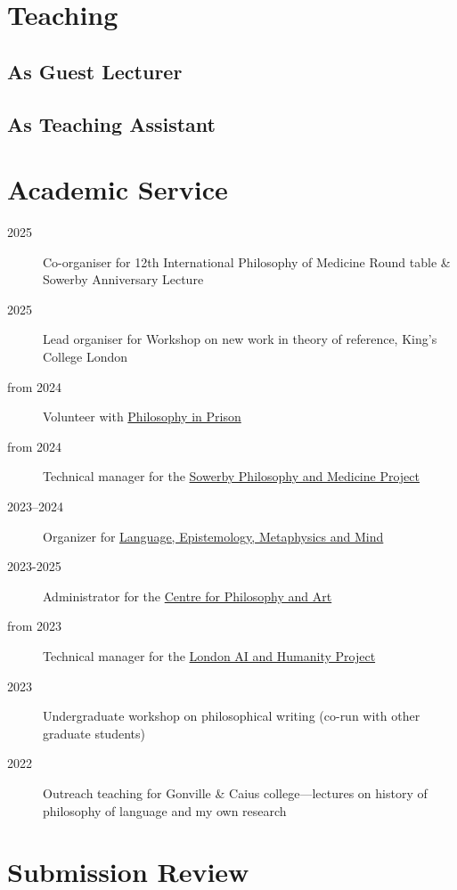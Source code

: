 \documentclass{cv}
\begin{document}
\section*{Teaching}
\subsection*{As Guest Lecturer}
\printbibliography[env=teaching,check=Teaching+GuestLecturer]{}

\subsection*{As Teaching Assistant}
\printbibliography[env=teaching,check=Teaching+TA]{}

\section*{Academic Service}
\begin{description}
\item[{2025}] Co-organiser for 12th International Philosophy of
Medicine Round table \& Sowerby Anniversary Lecture
\item[{2025}] Lead organiser for Workshop on new work in theory of reference, King's College London
\item[{from 2024}] Volunteer with \href{https://www.philosophyinprison.com/}{Philosophy in Prison}
\item[{from 2024}] Technical manager for the \href{https://www.philosophyandmedicine.org/}{Sowerby Philosophy and
Medicine Project}
\item[{2023--2024}] Organizer for \href{https://www.lemm-london.co.uk/}{Language, Epistemology, Metaphysics and Mind}
\item[{2023-2025}] Administrator for the \href{https://philosophyarts.co.uk/}{Centre for Philosophy and Art}
\item[{from 2023}] Technical manager for the \href{https://www.ai-humanity-london.com/}{London AI and Humanity Project}
\item[{2023}] Undergraduate workshop on philosophical writing (co-run with other graduate students)
\item[{2022}] Outreach teaching for Gonville \& Caius college---lectures on
history of philosophy of language and my own research
\end{description}

\section*{Submission Review}
\end{document}
